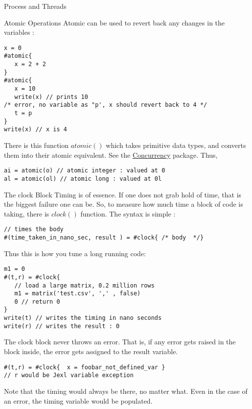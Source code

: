 \begin{section}{Process and Threads}
\begin{subsection}{Atomic Operations}
Atomic can be used to revert back any changes in the variables :
\begin{lstlisting}[style=JexlStyle]
x = 0 
#atomic{
   x = 2 + 2    
}
#atomic{
   x = 10
   write(x) // prints 10 
/* error, no variable as "p', x should revert back to 4 */   
   t = p
}
write(x) // x is 4 
\end{lstlisting}

There is this function $atomic()$ which takes primitive data types,
and converts them into their atomic equivalent.
See the \href{https://docs.oracle.com/javase/8/docs/api/java/util/concurrent/atomic/package-summary.html}{Concurrency} package.
Thus, 

\begin{lstlisting}[style=JexlStyle]
ai = atomic(o) // atomic integer : valued at 0  
al = atomic(ol) // atomic long : valued at 0l  
\end{lstlisting}

\end{subsection}

\begin{subsection}{The clock Block}
Timing is of essence. If one does not grab hold of time, that is the biggest failure one can be.
So, to measure how much time a block of code is taking, there is $clock()$ function.
The syntax is simple :

\begin{lstlisting}[style=JexlStyle]
// times the body
#(time_taken_in_nano_sec, result ) = #clock{ /* body  */}
\end{lstlisting}
Thus this is how you tune a long running code:
\begin{lstlisting}[style=JexlStyle]
m1 = 0 
#(t,r) = #clock{
   // load a large matrix, 0.2 million rows 
   m1 = matrix('test.csv', ',' , false)
   0 // return 0 
}
write(t) // writes the timing in nano seconds 
write(r) // writes the result : 0  
\end{lstlisting}

The clock block never throws an error.
That is, if any error gets raised in the block inside,
the error gets assigned to the result variable.
\begin{lstlisting}[style=JexlStyle]
#(t,r) = #clock{  x = foobar_not_defined_var }
// r would be Jexl variable exception
\end{lstlisting}

Note that the timing would always be there, 
no matter what. Even in the case of an error, 
the timing variable would be populated.

\end{subsection}

\end{section}

